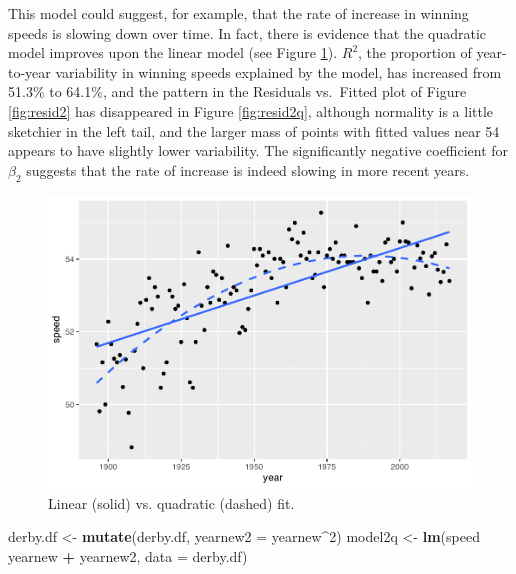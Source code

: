\documentclass[
]{krantz}
\newenvironment{Shaded}{\begin{snugshade}}{\end{snugshade}}
\newcommand{\DataTypeTok}[1]{\textcolor[rgb]{0.27,0.27,0.27}{#1}}
\newcommand{\DecValTok}[1]{\textcolor[rgb]{0.06,0.06,0.06}{#1}}
\newcommand{\KeywordTok}[1]{\textcolor[rgb]{0.27,0.27,0.27}{\textbf{#1}}}
\newcommand{\NormalTok}[1]{#1}
\newcommand{\OperatorTok}[1]{\textcolor[rgb]{0.43,0.43,0.43}{\textbf{#1}}}
\newcommand{\StringTok}[1]{\textcolor[rgb]{0.5,0.5,0.5}{#1}}
\begin{document}
This model could suggest, for example, that the rate of increase in winning speeds is slowing down over time. In fact, there is evidence that the quadratic model improves upon the linear model (see Figure \ref{fig:models2and2q}). \(R^2\),  the proportion of year-to-year variability in winning speeds explained by the model, has increased from 51.3\% to 64.1\%, and the pattern in the Residuals vs.~Fitted plot of Figure \ref{fig:resid2} has disappeared in Figure \ref{fig:resid2q}, although normality is a little sketchier in the left tail, and the larger mass of points with fitted values near 54 appears to have slightly lower variability. The significantly negative coefficient for \(\beta_{2}\) suggests that the rate of increase is indeed slowing in more recent years.

\begin{figure}

{\centering \includegraphics[width=0.9\linewidth]{bookdown-BeyondMLR_files/figure-latex/models2and2q-1} 

}

\caption{Linear (solid) vs. quadratic (dashed) fit.}\label{fig:models2and2q}
\end{figure}

\begin{Shaded}
\begin{Highlighting}[]
\NormalTok{derby.df <-}\StringTok{ }\KeywordTok{mutate}\NormalTok{(derby.df, }\DataTypeTok{yearnew2 =}\NormalTok{ yearnew}\OperatorTok{^}\DecValTok{2}\NormalTok{)}
\NormalTok{model2q <-}\StringTok{ }\KeywordTok{lm}\NormalTok{(speed }\OperatorTok{~}\StringTok{ }\NormalTok{yearnew }\OperatorTok{+}\StringTok{ }\NormalTok{yearnew2, }\DataTypeTok{data =}\NormalTok{ derby.df)}
\end{Highlighting}
\end{Shaded}
\end{document}
